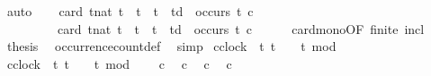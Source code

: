 \begin{isabellebody}
\ auto\isanewline
\ \ \isamarkupfalse%
\ {\isacartoucheopen}card\ {\isacharbraceleft}t{\isacharcolon}{\isacharcolon}nat{\isachardot}\ t\ {\isasymle}\ t\ {\isasymand}\ t\ {\isacharless}\ td\ {\isasymand}\ occurs\ t\ c{\isacharbraceright}\isanewline
\ \ \ \ \ \ \ \ {\isasymle}\ card\ {\isacharbraceleft}t{\isacharcolon}{\isacharcolon}nat{\isachardot}\ t\ {\isasymle}\ t\ {\isasymand}\ t\ {\isacharless}\ td{\isacharprime}\ {\isasymand}\ occurs\ t\ c{\isacharbraceright}{\isacartoucheclose}\isanewline
\ \ \ \ \isamarkupfalse%
\ card{\isacharunderscore}mono{\isacharbrackleft}OF\ finite\ incl{\isacharbrackright}\ \isacommand{{\isachardot}}\isamarkupfalse%
\isanewline
\ \ \isamarkupfalse%
\ {\isacharquery}thesis\ \isamarkupfalse%
\ occurrence{\isacharunderscore}count{\isacharunderscore}def\ \isamarkupfalse%
\ simp\isanewline
{}\isamarkupfalse%
%
\endisatagproof
{\isafoldproof}%
%
\isadelimproof
%
\endisadelimproof
%
\isadelimdocument
%
\endisadelimdocument
%
\isatagdocument
%
\isamarkuptrue%
%
\endisatagdocument
{\isafolddocument}%
%
\isadelimdocument
%
\endisadelimdocument
{}\isamarkupfalse%
\ {\isacartoucheopen}c{}{\isacharcolon}{\isacharcolon}clock\ {\isasymequiv}\ {\isacharparenleft}{\isasymlambda}t{\isachardot}\ t\ {\isasymge}\ {}\ {\isasymand}\ {\isacharparenleft}t{\isacharminus}{}{\isacharparenright}\ mod\ {}\ {\isacharequal}\ {}{\isacharparenright}{\isacartoucheclose}\isanewline
{}\isamarkupfalse%
\ {\isacartoucheopen}c{}{\isacharcolon}{\isacharcolon}clock\ {\isasymequiv}\ {\isacharparenleft}{\isasymlambda}t{\isachardot}\ t\ {\isasymge}\ {}\ {\isasymand}\ {\isacharparenleft}t{\isacharminus}{}{\isacharparenright}\ mod\ {}\ {\isacharequal}\ {}{\isacharparenright}{\isacartoucheclose}\isanewline
\isanewline
{}\isamarkupfalse%
\ {\isacartoucheopen}c{}\ {}{\isacartoucheclose}\isanewline
{}\isamarkupfalse%
\ {\isacartoucheopen}c{}\ {}{\isacartoucheclose}\isanewline
{}\isamarkupfalse%
\ {\isacartoucheopen}c{}\ {}{\isacartoucheclose}\isanewline
{}\isamarkupfalse%
\ {\isacartoucheopen}c{}\ {}{\isacartoucheclose}\isanewline

\end{isabellebody}
